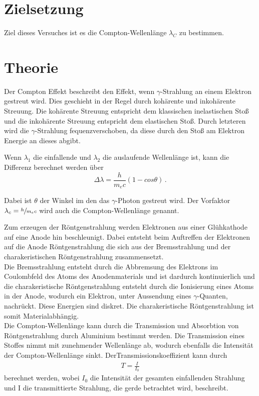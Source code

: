 \section{Zielsetzung}
Ziel dieses Versuches ist es die Compton-Wellenlänge $\lambda_C$ zu bestimmen.

\section{Theorie}
Der Compton Effekt beschreibt den Effekt, wenn $\gamma$-Strahlung an einem Elektron gestreut wird. Dies geschieht in der Regel durch kohärente und inkohärente Streuung. 
Die kohärente Streuung entspricht dem klassischen inelastischen Stoß und die inkohärente Streuung entspricht dem elastischen Stoß. Durch letzteren wird die $\gamma$-Strahlung
fequenzverschoben, da diese durch den Stoß am Elektron Energie an dieses abgibt. 

\noindent
Wenn $\lambda_1$ die einfallende und $\lambda_2$ die auslaufende Wellenlänge ist, kann die Differenz berechnet werden über
\begin{equation}
    \Delta \lambda = \frac{h}{m_ec} \left(1 - cos \theta \right) \, .
    \label{eqn:lambda}
\end{equation}

\noindent
Dabei ist $\theta$ der Winkel im den das $\gamma$-Photon gestreut wird. Der Vorfaktor $\lambda_c = \sfrac{h}{m_ec}$ wird auch die Compton-Wellenlänge genannt. 

\noindent
Zum erzeugen der Röntgenstrahlung werden Elektronen aus einer Glühkathode auf eine Anode hin beschleunigt. Dabei entsteht beim Auftreffen der Elektronen auf die Anode
Röntgenstrahlung die sich aus der Bremsstrahlung und der charakeristischen Röntgenstrahlung zusammensetzt. \\
Die Bremsstrahlung entsteht durch die Abbremsung des Elektrons im Coulombfeld des Atoms des Anodenmaterials und ist dardurch kontinuierlich 
und die charakeristische Röntgenstrahlung entsteht durch die Ionisierung eines Atoms in der Anode, wodurch ein Elektron, unter Aussendung eines $\gamma$-Quanten, nachrückt. Diese
Energien sind diskret. Die charakeristische Röntgenstrahlung ist somit Materialabhängig. \\
\noindent
Die Compton-Wellenlänge kann durch die Transmission und Absorbtion von Röntgenstrahlung durch Aluminium bestimmt werden. Die Transmission eines Stoffes nimmt mit zunehmender Wellenlänge
ab, wodurch ebenfalls die Intensität der Compton-Wellenlänge sinkt. 
DerTransmissionskoeffizient kann durch
\begin{align}
    T=\frac{I}{I_0} \label{eq:3}
\end{align}
berechnet werden, wobei $I_0$ die Intensität der gesamten einfallenden Strahlung und I die transmittierte Strahlung, die gerde betrachtet wird, beschreibt.\\

